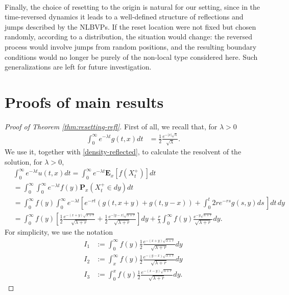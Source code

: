 \documentclass[11pt,a4paper]{article}
\theoremstyle{definition}
\theoremstyle{remark}
\begin{document}
	\\
	Finally, the choice of resetting to the origin is natural for our setting, since in the time-reversed dynamics it leads to a well-defined structure of reflections and jumps described by the NLBVPs. If the reset location were not fixed but chosen randomly, according to a distribution, the situation would change: the reversed process would involve jumps from random positions, and the resulting boundary conditions would no longer be purely of the non-local type considered here. Such generalizations are left for future investigation.


	\section{Proofs of main results}
	\label{sec:proofs}
	\begin{proof}[Proof of Theorem \ref{thm:resetting-refl}]
		First of all, we recall that, for $\lambda >0$
		\begin{align*}
			\int_0^\infty e^{-\lambda t} g(t,x) dt &= \frac{1}{2} \frac{e^{-\vert x \vert \sqrt{\lambda}}}{\sqrt{\lambda}}.
		\end{align*}
		We use it, together with \eqref{density-reflected}, to calculate the resolvent of the solution, for $\lambda >0$, 
		\begin{align*}
			&\int_{0}^\infty e^{-\lambda t} u(t,x) dt = \int_{0}^\infty e^{-\lambda t} \mathbf{E}_x[f(X^+_t)] dt\\
			&= \int_{0}^\infty \int_{0}^\infty  e^{-\lambda t} f(y) \mathbf{P}_x (X_t^+ \in dy) dt\\
			&= \int_0^\infty f(y) \int_0^\infty e^{-\lambda t} \left[e^{-rt} (g(t,x+y) + g(t, y-x) ) + \int_{0}^{t} 2r e^{-rs} g(s,y) ds\,\right] dt\, dy\\
			&=\int_0^\infty f(y) \left[\frac{1}{2} \frac{e^{-(x+y) \sqrt{\lambda + r}}}{\sqrt{\lambda + r}} + \frac{1}{2} \frac{e^{-\vert y-x \vert \sqrt{\lambda + r}}}{\sqrt{\lambda + r}}\right] dy + \frac{r}{\lambda} \int_{0}^\infty f(y) \frac{e^{-y \sqrt{\lambda + r}}}{\sqrt{\lambda + r}} dy.
		\end{align*}
		For simplicity, we use the notation 
		\begin{align*}
			I_1 &:= \int_0^\infty f(y) \frac{1}{2} \frac{e^{-(x+y) \sqrt{\lambda + r}}}{\sqrt{\lambda + r}} dy\\
			I_2 &:= \int_{x}^{\infty}  f(y) \frac{1}{2} \frac{e^{-(y-x) \sqrt{\lambda + r}}}{\sqrt{\lambda + r}} dy\\
			I_3 &:=\int_{0}^{x} f(y) \frac{1}{2} \frac{e^{-(x-y) \sqrt{\lambda + r}}}{\sqrt{\lambda + r}} dy.

\end{align*}
\end{proof}
\end{document}
